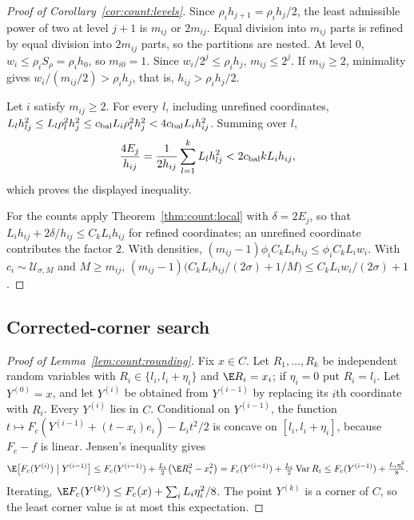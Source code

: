 \begin{proof}[Proof of Corollary~\ref{cor:count:levels}]
Since $\rho_ih_{j+1}=\rho_ih_j/2$, the least admissible power of two at level
$j+1$ is $m_{ij}$ or $2m_{ij}$. Equal division into $m_{ij}$ parts is refined
by equal division into $2m_{ij}$ parts, so the partitions are nested. At
level $0$, $w_i\le\rho_iS_\rho=\rho_ih_0$, so $m_{i0}=1$. Since
$w_i/2^j\le\rho_ih_j$, $m_{ij}\le2^j$. If $m_{ij}\ge2$, minimality gives
$w_i/(m_{ij}/2)>\rho_ih_j$, that is, $h_{ij}>\rho_ih_j/2$.

Let $i$ satisfy $m_{ij}\ge2$. For every $l$, including unrefined
coordinates,
$L_lh_{lj}^2\le L_l\rho_l^2h_j^2\le c_{\rm bal}L_i\rho_i^2h_j^2
<4c_{\rm bal}L_ih_{ij}^2$. Summing over $l$,
\[
 \frac{4E_j}{h_{ij}}=\frac1{2h_{ij}}\sum_{l=1}^kL_lh_{lj}^2
 <2c_{\rm bal}kL_ih_{ij},
\]
which proves the displayed inequality.

For the counts apply Theorem~\ref{thm:count:local} with $\delta=2E_j$, so
that $L_ih_{ij}+2\delta/h_{ij}\le C_kL_ih_{ij}$ for refined coordinates;
an unrefined coordinate contributes the factor $2$. With densities,
$(m_{ij}-1)\phi_iC_kL_ih_{ij}\le\phi_iC_kL_iw_i$. With
$c_i\sim\mathcal U_{\sigma,M}$ and $M\ge m_{ij}$,
$(m_{ij}-1)\bigl(C_kL_ih_{ij}/(2\sigma)+1/M\bigr)\le C_kL_iw_i/(2\sigma)+1$.
\end{proof}

\subsection{Corrected-corner search}

\begin{proof}[Proof of Lemma~\ref{lem:count:rounding}]
Fix $x\in C$. Let $R_1,\dots,R_k$ be independent random variables with
$R_i\in\{l_i,l_i+\eta_i\}$ and $\E R_i=x_i$; if $\eta_i=0$ put $R_i=l_i$. Let
$Y^{(0)}=x$, and let $Y^{(i)}$ be obtained from $Y^{(i-1)}$ by replacing its
$i$th coordinate with $R_i$. Every $Y^{(i)}$ lies in $C$. Conditional on
$Y^{(i-1)}$, the function $t\mapsto F_c(Y^{(i-1)}+(t-x_i)e_i)-L_it^2/2$ is
concave on $[l_i,l_i+\eta_i]$, because $F_c-f$ is linear. Jensen's
inequality gives
\[
 \E\bigl[F_c(Y^{(i)})\bigm|Y^{(i-1)}\bigr]
 \le F_c(Y^{(i-1)})+\tfrac{L_i}2\bigl(\E R_i^2-x_i^2\bigr)
 =F_c(Y^{(i-1)})+\tfrac{L_i}2\operatorname{Var}R_i
 \le F_c(Y^{(i-1)})+\tfrac{L_i\eta_i^2}8 .
\]
Iterating, $\E F_c(Y^{(k)})\le F_c(x)+\sum_iL_i\eta_i^2/8$. The point
$Y^{(k)}$ is a corner of $C$, so the least corner value is at most this
expectation.
\end{proof}

